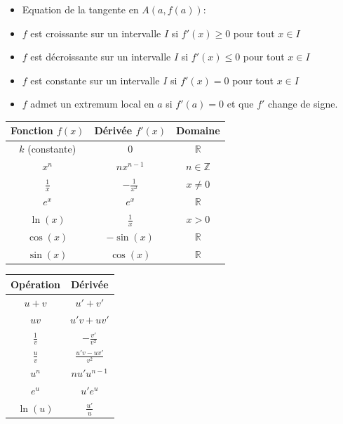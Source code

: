 \begin{easybox}[Dérivation]{}
		\begin{itemize}
			\item Equation de la tangente en $A(a, f(a))$: 
			\item $f$ est croissante sur un intervalle $I$ si $f'(x) \geq 0$ pour tout $x \in I$
			\item $f$ est décroissante sur un intervalle $I$ si $f'(x) \leq 0$ pour tout $x \in I$
			\item $f$ est constante sur un intervalle $I$ si $f'(x) = 0$ pour tout $x \in I$	
			\item $f$ admet un extremum local en $a$ si $f'(a)=0$ et que $f'$ change de signe.
		\end{itemize}
		
\begin{minipage}{0.48\linewidth}
	
\begin{center}
\begin{tabular}{|c|c|c|}
\hline
Fonction $f(x)$ & Dérivée $f'(x)$ & Domaine \\
\hline
$k$ (constante) & $0$ & $\mathbb{R}$ \\
$x^n$ & $nx^{n-1}$ & $n \in \mathbb{Z}$ \\
$\frac{1}{x}$ & $-\frac{1}{x^2}$ & $x \neq 0$ \\
$e^x$ & $e^x$ & $\mathbb{R}$ \\
$\ln(x)$ & $\frac{1}{x}$ & $x > 0$ \\
$\cos(x)$ & $-\sin(x)$ & $\mathbb{R}$ \\
$\sin(x)$ & $\cos(x)$ & $\mathbb{R}$ \\
\hline
\end{tabular}
\end{center}
\end{minipage}\hfill
\begin{minipage}{0.48\linewidth}


\begin{center}
\begin{tabular}{|c|c|}
\hline
Opération & Dérivée \\
\hline
$u + v$ & $u' + v'$ \\
$uv$ & $u'v + uv'$ \\
$\frac{1}{v}$ & $-\frac{v'}{v^2}$ \\
$\frac{u}{v}$ & $\frac{u'v - uv'}{v^2}$ \\
$u^n$ & $n u' u^{n-1}$ \\
$e^u$ & $u' e^u$ \\
$\ln(u)$ & $\frac{u'}{u}$ \\
\hline
\end{tabular}
\end{center}
\end{minipage}

\end{easybox}

